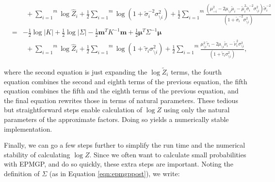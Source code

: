 \documentclass[twoside,11pt]{article}
\def\m{{\mathbf m}}
\def\boldmu{\bm{\mu}}
\newcommand{\wo}{\setminus}
\begin{document}
\begin{eqnarray}
\nonumber \\ && ~~
+ \overset{m}{\sum_{i=1}}\log
\hat{Z}_i + \frac{1}{2}\overset{m}{\sum_{i=1}}\log (1 + \tilde{\sigma}^{-2}_i\sigma_{\wo i}^2) 
+ \frac{1}{2}\overset{m}{\sum_{i=1}}\frac{(\mu_{-i}^2 - 2\mu_{\wo i}\tilde{\mu}_i - \tilde{\mu}^2_i\tilde{\sigma}^{-2}_i\sigma^2_{\wo i})\tilde{\sigma}^{-2}_i}{(1 + \tilde{\sigma}^{-2}_i\sigma_{\wo i}^2) } 
\nonumber \\
& = & 
-\frac{1}{2}\log\lvert K \rvert 
+ \frac{1}{2}\log\lvert \Sigma \rvert 
-\frac{1}{2}\m^TK^{-1}\m \nonumber 
+\frac{1}{2}\boldmu^T\Sigma^{-1}\boldmu
\\ && ~~
+ \overset{m}{\sum_{i=1}}\log
\hat{Z}_i + \frac{1}{2}\overset{m}{\sum_{i=1}}\log (1 + \tilde{\tau}_i\sigma_{\wo i}^2) 
+ \frac{1}{2}\overset{m}{\sum_{i=1}}\frac{\mu_{\wo i}^2\tilde{\tau}_i - 2\mu_{\wo i}\tilde{\nu}_i - \tilde{\nu}^{2}_i\sigma^2_{\wo i}}{(1 + \tilde{\tau}_i\sigma_{\wo i}^2) }, 
\end{eqnarray}

\noindent where the second equation is just expanding the $\log \tilde{Z}_i$ terms, the fourth equation combines the second and eighth terms of the previous equation, the fifth equation combines the fifth and the eighth terms of the previous equation, and the final equation rewrites those in terms of natural parameters. These tedious but straightforward steps enable calculation of $\log Z$ using only the natural parameters of the approximate factors.  Doing so yields a numerically stable implementation.  

Finally, we can go a few steps further to simplify the run time and the numerical stability of calculating $\log Z$.  Since we often want to calculate small probabilities with EPMGP, and do so quickly, these extra steps are important.  Noting the definition of $\Sigma$ (as in Equation \ref{eqn:epmgppost}), we write:
\end{document}
